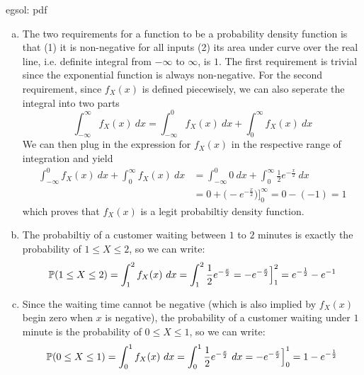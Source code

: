 \begin{egsol}[]{egsol: pdf}
    \begin{enumerate}[a)]
        \item The two requirements for a function to be a probability density function is that (1) it is non-negative for all inputs (2) its area under curve over the real line, i.e. definite integral from $-\infty$ to $\infty$, is $1$.  The first requirement is trivial since the exponential function is always non-negative.  For the second requirement, since $f_X(x)$ is defined piecewisely, we can also seperate the integral into two parts
        \[\int_{-\infty}^{\infty} f_X(x)~dx = \int_{-\infty}^{0} f_X(x)~dx + \int_{0}^{\infty} f_X(x)~dx\]
        We can then plug in the expression for $f_X(x)$ in the respective range of integration and yield
        \begin{align*}
            \int_{-\infty}^{0} f_X(x)~dx + \int_{0}^{\infty} f_X(x)~dx &= \int_{-\infty}^{0} 0~dx + \int_{0}^{\infty} \frac{1}{2}e^{-\frac{x}{2}}~dx\\
            &= 0 + \big(-e^{-\frac{x}{2}}\big)\Big]_0^{\infty} = 0 - (-1) = 1
        \end{align*}
        which proves that $f_X(x)$ is a legit probabiltiy density function.
        \item The probabiltiy of a customer waiting between $1$ to $2$ minutes is exactly the probability of $1 \le X \le 2$, so we can write:
        \[\mathbb{P}(1 \le X \le 2) = \int_1^2 f_X(x)~dx = \int_1^2 \frac{1}{2}e^{-\frac{x}{2}} = -e^{-\frac{x}{2}}\Big]_1^2 = e^{-\frac{1}{2}} - e^{-1}\]
        \item Since the waiting time cannot be negative (which is also implied by $f_X(x)$ begin zero when $x$ is negative), the probability of a customer waiting under $1$ minute is the probability of $0 \le X \le 1$, so we can write:
        \[\mathbb{P}(0 \le X \le 1) = \int_0^1 f_X(x)~dx = \int_0^1 \frac{1}{2}e^{-\frac{x}{2}}~dx = -e^{-\frac{x}{2}}\Big]_0^1 = 1-e^{-\frac{1}{2}}\]
    \end{enumerate}
\end{egsol}

